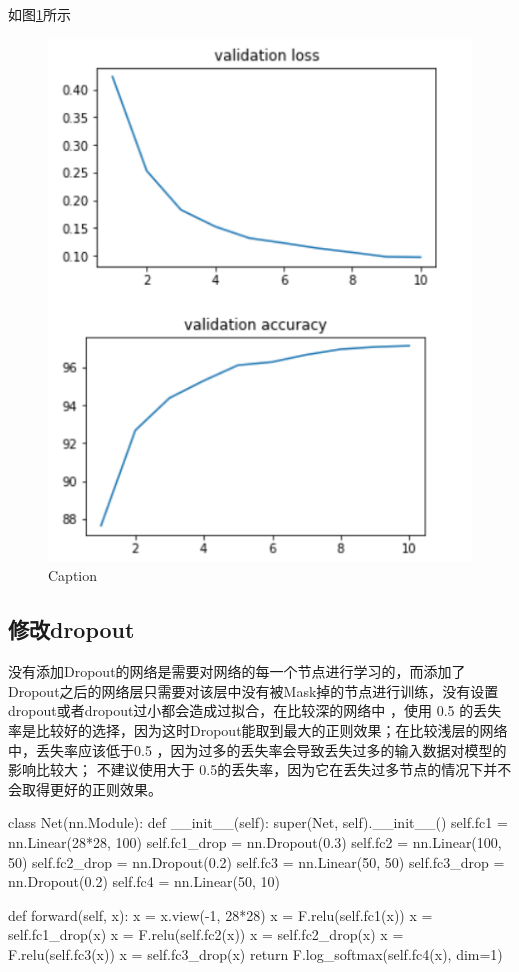 \documentclass[UTF8,a4paper,10pt]{ctexart}
\begin{document}
如图\ref{fig:1}所示
\begin{figure}[H]
    \centering
    \includegraphics[scale=0.3]{2.png}
    \caption{Caption}
    \label{fig:1}
\end{figure}

\subsection{修改dropout}

没有添加Dropout的网络是需要对网络的每一个节点进行学习的，而添加了Dropout之后的网络层只需要对该层中没有被Mask掉的节点进行训练，没有设置dropout或者dropout过小都会造成过拟合，在比较深的网络中
，使用 0.5 的丢失率是比较好的选择，因为这时Dropout能取到最大的正则效果；在比较浅层的网络中，丢失率应该低于0.5 ，因为过多的丢失率会导致丢失过多的输入数据对模型的影响比较大；
不建议使用大于 0.5的丢失率，因为它在丢失过多节点的情况下并不会取得更好的正则效果。


\begin{python}
    class Net(nn.Module):
    def __init__(self):
        super(Net, self).__init__()
        self.fc1 = nn.Linear(28*28, 100)
        self.fc1_drop = nn.Dropout(0.3)
        self.fc2 = nn.Linear(100, 50)
        self.fc2_drop = nn.Dropout(0.2)
        self.fc3 = nn.Linear(50, 50)
        self.fc3_drop = nn.Dropout(0.2)
        self.fc4 = nn.Linear(50, 10)

    def forward(self, x):
        x = x.view(-1, 28*28)
        x = F.relu(self.fc1(x))
        x = self.fc1_drop(x)
        x = F.relu(self.fc2(x))
        x = self.fc2_drop(x)
        x = F.relu(self.fc3(x))
        x = self.fc3_drop(x)
        return F.log_softmax(self.fc4(x), dim=1)
\end{python}
\end{document}

